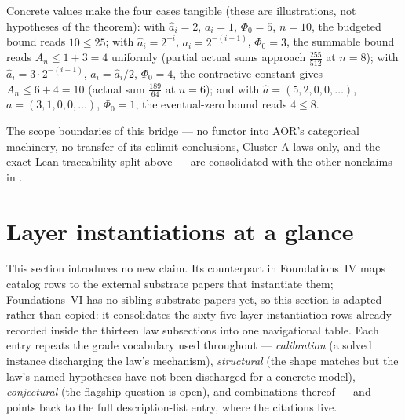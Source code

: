 \documentclass[11pt]{article}
\newcommand{\FVI}{Foundations~VI}
\newcommand{\FoundIV}{Foundations~IV}
\theoremstyle{definition}
\begin{document}
Concrete values make the four cases tangible (these are illustrations, not hypotheses of the
theorem): with $\widehat{a}_i = 2$, $a_i = 1$, $\Phi_0 = 5$, $n = 10$, the budgeted bound reads
$10 \le 25$; with $\widehat{a}_i = 2^{-i}$, $a_i = 2^{-(i+1)}$, $\Phi_0 = 3$, the summable bound
reads $A_n \le 1 + 3 = 4$ uniformly (partial actual sums approach $\tfrac{255}{512}$ at $n = 8$);
with $\widehat{a}_i = 3 \cdot 2^{-(i-1)}$, $a_i = \widehat{a}_i / 2$, $\Phi_0 = 4$, the contractive
constant gives $A_n \le 6 + 4 = 10$ (actual sum $\tfrac{189}{64}$ at $n = 6$); and with
$\widehat{a} = (5, 2, 0, 0, \ldots)$, $a = (3, 1, 0, 0, \ldots)$, $\Phi_0 = 1$, the eventual-zero
bound reads $4 \le 8$.

The scope boundaries of this bridge --- no functor into AOR's categorical machinery, no transfer of
its colimit conclusions, Cluster-A laws only, and the exact Lean-traceability split above --- are
consolidated with the other nonclaims in .

 \section{Layer instantiations at a glance}\label{sec:instantiations-glance}

This section introduces no new claim. Its counterpart in \FoundIV{} maps catalog rows to the external
substrate papers that instantiate them; \FVI{} has no sibling substrate papers yet, so this section is
adapted rather than copied: it consolidates the sixty-five layer-instantiation rows already recorded
inside the thirteen law subsections into one navigational table. Each entry repeats the grade
vocabulary used throughout --- \emph{calibration} (a solved instance discharging the law's mechanism),
\emph{structural} (the shape matches but the law's named hypotheses have not been discharged for a
concrete model), \emph{conjectural} (the flagship question is open), and combinations thereof --- and
points back to the full description-list entry, where the citations live.
\end{document}
